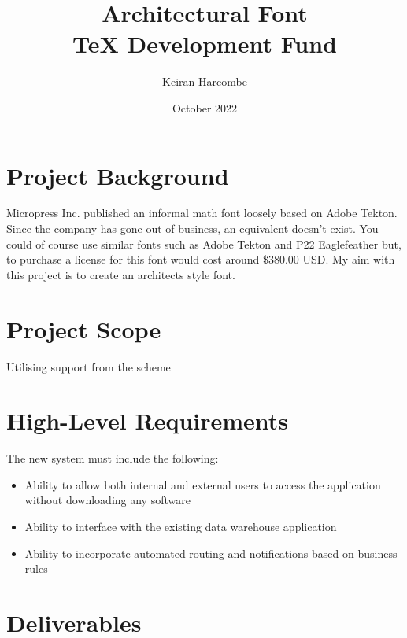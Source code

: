\documentclass[a4paper]{article}
\title{Architectural Font \\ TeX Development Fund}
\author{Keiran Harcombe}
\date{October 2022}
\begin{document}
\maketitle
\section{Project Background} %
Micropress Inc. published an informal math font loosely based on Adobe Tekton. Since the company has gone out of business, an equivalent doesn't exist. You could of course use similar fonts such as Adobe Tekton and P22 Eaglefeather but, to purchase a license for this font would cost around \$380.00 USD.
My aim with this project is to create an architects style font.

\section{Project Scope} %
Utilising support from the scheme

\section{High-Level Requirements} %
The new system must include the following:
\begin{itemize}
    \item Ability to allow both internal and external users to access the application without downloading any software 
    \item Ability to interface with the existing data warehouse application 
    \item Ability to incorporate automated routing and notifications based on business rules
\end{itemize}

\section{Deliverables} %
\end{document}

